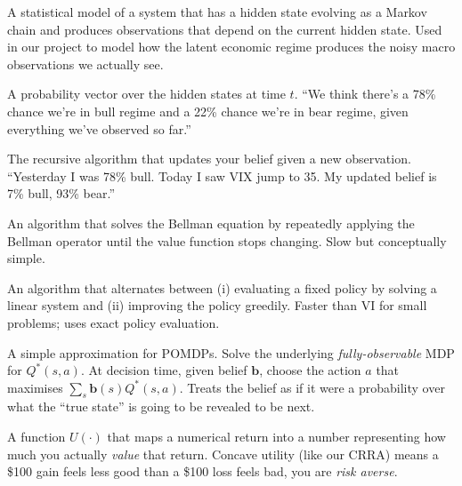 \documentclass[11pt]{article}
\newcommand{\bel}{\mathbf{b}}
\begin{document}
\begin{definition}
A statistical model of a system that has a hidden state evolving as a Markov chain and produces observations that depend on the current hidden state. Used in our project to model how the latent economic regime produces the noisy macro observations we actually see.
\end{definition}

\begin{definition}[Belief $\bel_t$]
A probability vector over the hidden states at time $t$. ``We think there's a 78\% chance we're in bull regime and a 22\% chance we're in bear regime, given everything we've observed so far.''
\end{definition}

\begin{definition}
The recursive algorithm that updates your belief given a new observation. ``Yesterday I was 78\% bull. Today I saw VIX jump to 35. My updated belief is 7\% bull, 93\% bear.''
\end{definition}

\begin{definition}
An algorithm that solves the Bellman equation by repeatedly applying the Bellman operator until the value function stops changing. Slow but conceptually simple.
\end{definition}

\begin{definition}
An algorithm that alternates between (i) evaluating a fixed policy by solving a linear system and (ii) improving the policy greedily. Faster than VI for small problems; uses exact policy evaluation.
\end{definition}

\begin{definition}[QMDP]
A simple approximation for POMDPs. Solve the underlying \emph{fully-observable} MDP for $Q^*(s, a)$. At decision time, given belief $\bel$, choose the action $a$ that maximises $\sum_s \bel(s) Q^*(s, a)$. Treats the belief as if it were a probability over what the ``true state'' is going to be revealed to be next.
\end{definition}

\begin{definition}[Utility]
A function $U(\cdot)$ that maps a numerical return into a number representing how much you actually \emph{value} that return. Concave utility (like our CRRA) means a \$100 gain feels less good than a \$100 loss feels bad, you are \emph{risk averse}.
\end{definition}
\end{document}
